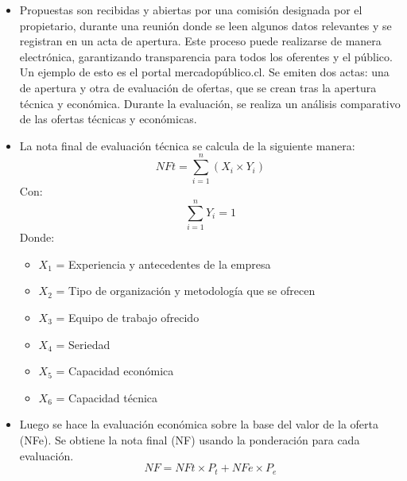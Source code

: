 \begin{itemize}
\begin{itemize}
        \begin{itemize}
            \item Propuestas son recibidas y abiertas por una comisión designada por el propietario, durante una reunión donde se leen algunos datos relevantes y se registran en un acta de apertura. Este proceso puede realizarse de manera electrónica, garantizando transparencia para todos los oferentes y el público. Un ejemplo de esto es el portal mercadopúblico.cl. Se emiten dos actas: una de apertura y otra de evaluación de ofertas, que se crean tras la apertura técnica y económica. Durante la evaluación, se realiza un análisis comparativo de las ofertas técnicas y económicas.
            \item La nota final de evaluación técnica se calcula de la siguiente manera:
            \begin{equation}
                NFt = \sum_{i=1}^{n} (X_i \times Y_i)
            \end{equation}
            Con:
            \begin{equation}
                \sum_{i=1}^{n} Y_i = 1 
            \end{equation}
            Donde:
            \begin{itemize}
                \item $X_1$ = Experiencia y antecedentes de la empresa
                \item $X_2$ = Tipo de organización y metodología que se ofrecen
                \item $X_3$ = Equipo de trabajo ofrecido
                \item $X_4$ = Seriedad
                \item $X_5$ = Capacidad económica
                \item $X_6$ = Capacidad técnica
            \end{itemize}
            \item Luego se hace la evaluación económica sobre la base del valor de la oferta (NFe). Se obtiene la nota final (NF) usando la ponderación para cada evaluación.
            \begin{equation}
                NF = NFt \times P_t + NFe \times P_e
            \end{equation}
        \end{itemize}
    \end{itemize}
\end{itemize}
 